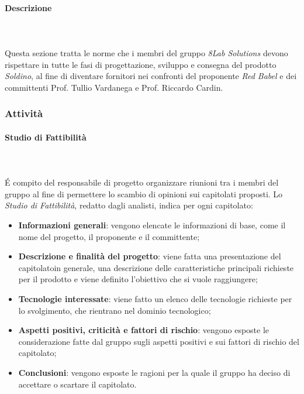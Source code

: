 \paragraph{Descrizione} \mbox{}\\ \mbox{}\\
	Questa sezione tratta le norme che i membri del gruppo \textit{8Lab Solutions} 
devono rispettare in tutte le fasi di progettazione, sviluppo e consegna del 
prodotto \textit{Soldino}, al fine di diventare fornitori nei confronti del 
proponente \textit{Red Babel} e dei committenti Prof. Tullio Vardanega e Prof. 
Riccardo Cardin.

\subsubsection{Attività}

\paragraph{Studio di Fattibilità} \mbox{}\\ \mbox{}\\
\'E compito del responsabile di progetto organizzare riunioni tra i membri del 
gruppo al fine di permettere lo scambio di opinioni sui capitolati proposti.
Lo \textit{Studio di Fattibilità}, redatto dagli analisti, indica per ogni 
capitolato\glo:
	\begin{itemize}
		\item \textbf{Informazioni generali}: vengono elencate le informazioni di 
			base, come il nome del progetto, il proponente e il committente;
		\item \textbf{Descrizione e finalità del progetto}: viene fatta una 
			presentazione del capitolato\glosp in generale, una descrizione delle 
			caratteristiche principali richieste per il prodotto e viene definito 
			l'obiettivo che si vuole raggiungere;
		\item \textbf{Tecnologie interessate}: viene fatto un elenco delle tecnologie 
			richieste per lo svolgimento, che rientrano nel dominio tecnologico;
		\item \textbf{Aspetti positivi, criticità e fattori di rischio}: vengono 
			esposte le considerazione fatte dal gruppo sugli aspetti positivi e sui fattori 
			di rischio del capitolato\glo;
		\item \textbf{Conclusioni}: vengono esposte le ragioni per la quale il gruppo 
			ha deciso di accettare o scartare il capitolato\glo.
	\end{itemize}
		
